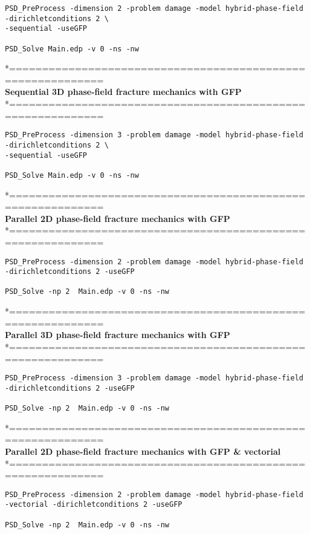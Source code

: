 \begin{lstlisting}[style=BashInputStyle]
PSD_PreProcess -dimension 2 -problem damage -model hybrid-phase-field  -dirichletconditions 2 \
-sequential -useGFP   

PSD_Solve Main.edp -v 0 -ns -nw   
\end{lstlisting}
*============================================================\\
\textbf{ Sequential 3D phase-field fracture mechanics with GFP} \\
*============================================================\\
\begin{lstlisting}[style=BashInputStyle]
PSD_PreProcess -dimension 3 -problem damage -model hybrid-phase-field  -dirichletconditions 2 \
-sequential -useGFP   

PSD_Solve Main.edp -v 0 -ns -nw   
\end{lstlisting}
*============================================================\\
\textbf{ Parallel 2D phase-field fracture mechanics with GFP} \\
*============================================================\\
\begin{lstlisting}[style=BashInputStyle]
PSD_PreProcess -dimension 2 -problem damage -model hybrid-phase-field -dirichletconditions 2 -useGFP   

PSD_Solve -np 2  Main.edp -v 0 -ns -nw   
\end{lstlisting}
*============================================================\\
\textbf{ Parallel 3D phase-field fracture mechanics with GFP }\\
*============================================================\\
\begin{lstlisting}[style=BashInputStyle]
PSD_PreProcess -dimension 3 -problem damage -model hybrid-phase-field -dirichletconditions 2 -useGFP   

PSD_Solve -np 2  Main.edp -v 0 -ns -nw   
\end{lstlisting}
*============================================================\\
\textbf{ Parallel 2D phase-field fracture mechanics with GFP \& vectorial} \\
*============================================================\\
\begin{lstlisting}[style=BashInputStyle]
PSD_PreProcess -dimension 2 -problem damage -model hybrid-phase-field -vectorial -dirichletconditions 2 -useGFP   

PSD_Solve -np 2  Main.edp -v 0 -ns -nw   
\end{lstlisting}
